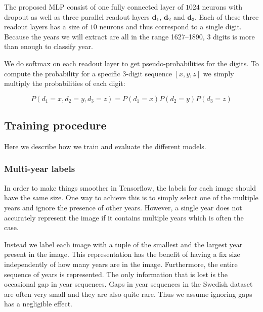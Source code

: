The proposed MLP consist of one fully connected layer of $1024$ neurons with dropout as well as three parallel readout layers $\mathbf{d}_1$, $\mathbf{d}_2$ and $\mathbf{d}_3$. Each of these three readout layers has a size of $10$ neurons and thus correspond to a single digit.
Because the years we will extract are all in the range 1627--1890, $3$ digits is more than enough to classify year.

We do softmax on each readout layer to get pseudo-probabilities for the digits.
To compute the probability for a specific 3-digit sequence $[x, y, z]$ we simply multiply the probabilities of each digit:

\[
P(d_1=x, d_2=y, d_3=z) = P(d_1=x) P(d_2=y) P(d_3=z)
\]


\subsection{Training procedure}

Here we describe how we train and evaluate the different models.

\subsubsection{Multi-year labels}

In order to make things smoother in Tensorflow, the labels for each image should have the same size. One way to achieve this is to simply select one of the multiple years and ignore the presence of other years. However, a single year does not accurately represent the image if it contains multiple years which is often the case.

Instead we label each image with a tuple of the smallest and the largest year present in the image. This representation has the benefit of having a fix size independently of how many years are in the image. Furthermore, the entire sequence of years is represented. The only information that is lost is the occasional gap in year sequences. Gaps in year sequences in the Swedish dataset are often very small and they are also quite rare. Thus we assume ignoring gaps has a negligible effect.




